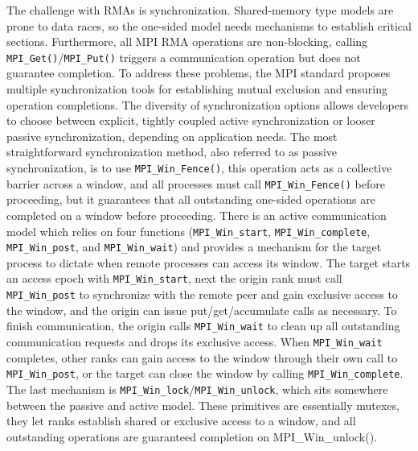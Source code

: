 The challenge with \gls{RMA}s is synchronization.
Shared-memory type models are prone to data races, so the one-sided model needs mechanisms to establish critical sections.
Furthermore, all \gls{MPI} \gls{RMA} operations are non-blocking, calling \texttt{MPI\_Get()}/\texttt{MPI\_Put()} triggers a communication operation but does not guarantee completion.
To address these problems, the \gls{MPI} standard proposes multiple synchronization tools for establishing mutual exclusion and ensuring operation completions.
The diversity of synchronization options allows developers to choose between explicit, tightly coupled active synchronization or looser passive synchronization, depending on application needs.
The most straightforward synchronization method, also referred to as passive synchronization, is to use \texttt{MPI\_Win\_Fence()}, this operation acts as a collective barrier across a window, and all processes must call \texttt{MPI\_Win\_Fence()} before proceeding, but it guarantees that all outstanding one-sided operations are completed on a window before proceeding. 
There is an active communication model which relies on four functions (\texttt{MPI\_Win\_start}, \texttt{MPI\_Win\_complete}, \texttt{MPI\_Win\_post}, and \texttt{MPI\_Win\_wait}) and provides a mechanism for the target process to dictate when remote processes can access its window.
The target starts an access epoch with \texttt{MPI\_Win\_start}, next the origin rank must call \texttt{MPI\_Win\_post} to synchronize with the remote peer and gain exclusive access to the window, and the origin can issue put/get/accumulate calls as necessary.
To finish communication, the origin calls \texttt{MPI\_Win\_wait} to clean up all outstanding communication requests and drops its exclusive access.
When \texttt{MPI\_Win\_wait} completes, other ranks can gain access to the window through their own call to \texttt{MPI\_Win\_post}, or the target can close the window by calling \texttt{MPI\_Win\_complete}.
The last mechanism is \texttt{MPI\_Win\_lock}/\texttt{MPI\_Win\_unlock}, which sits somewhere between the passive and active model.
These primitives are essentially mutexes, they let ranks establish shared or exclusive access to a window, and all outstanding operations are guaranteed completion on MPI\_Win\_unlock().

